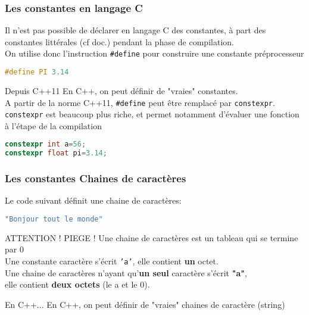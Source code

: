 \documentclass{beamer}
\begin{document}
\begin{frame}[fragile=singleslide,shrink=20]
\frametitle {Les constantes en langage C}
Il n'est pas possible de déclarer en langage C des constantes, à part des constantes littérales (cf doc.) pendant la phase de compilation. \\
On utilise donc l'instruction \texttt{\#define} pour construire une constante préprocesseur

\begin{lstlisting}[language=c++]
#define PI 3.14
\end{lstlisting}

\begin{block}{Depuis C++11}
En C++, on peut définir de "vraies" constantes.\\
A partir de la norme C++11, \texttt{\#define} peut être remplacé par \texttt{constexpr}. \\
\texttt{constexpr} est beaucoup plus riche, et permet notamment d'évaluer une fonction à l'étape de la compilation
\end{block}

\begin{lstlisting}[language=c++]
constexpr int a=56;
constexpr float pi=3.14;
\end{lstlisting}


\end{frame}



\begin{frame}[fragile=singleslide,shrink=20]
\frametitle {Les constantes Chaines de caractères}
Le code suivant définit une chaine de caractères:
\begin{lstlisting}[language=c++]
"Bonjour tout le monde"
\end{lstlisting}

\begin{block}{ATTENTION ! PIEGE !}
Une chaine de caractères est un tableau qui se termine par 0 \\
Une constante caractère s'écrit \texttt{'a'}, elle contient \textbf{un} octet.\\
Une chaine de caractères n'ayant qu'\textbf{un seul} caractère s'écrit \textbf{"a"}, \\
elle contient \textbf{deux octets} (le a et le 0).
\end{block}

\begin{block}{En C++...}
En C++, on peut définir de "vraies" chaines de caractère (string)
\end{block}

\end{frame}
\end{document}
